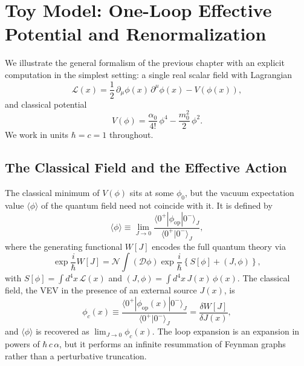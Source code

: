 \chapter{Toy Model: One-Loop Effective Potential and Renormalization}
\label{ch:toy-model}

We illustrate the general formalism of the previous chapter with an
explicit computation in the simplest setting: a single real scalar field
with Lagrangian
\begin{equation}
	\mathcal{L}(x) = \frac{1}{2}\,\partial_\mu\phi(x)\,\partial^\mu\phi(x)
	- V(\phi(x)),
	\label{eq:real_scalar_field}
\end{equation}
and classical potential
\begin{equation}
	V(\phi) = \frac{\alpha_0}{4!}\,\phi^4 - \frac{m_0^2}{2}\,\phi^2.
\end{equation}
We work in units $\hbar = c = 1$ throughout.

\section{The Classical Field and the Effective Action}

The classical minimum of $V(\phi)$ sits at some $\phi_0$, but the vacuum
expectation value $\langle\phi\rangle$ of the quantum field need not
coincide with it. It is defined by
\begin{equation}
	\langle\phi\rangle \equiv \lim_{J\to 0}
	\frac{\langle 0^+|\phi_{\text{op}}|0^-\rangle_J}
	{\langle 0^+|0^-\rangle_J},
\end{equation}
where the generating functional $W[J]$ encodes the full quantum theory via
\begin{equation}
	\exp\frac{i}{\hbar}W[J]
	= \mathcal{N}\int(\mathcal{D}\phi)
	\exp\frac{i}{\hbar}\left\{S[\phi] + (J,\phi)\right\},
\end{equation}
with $S[\phi] = \int d^4x\,\mathcal{L}(x)$ and
$(J,\phi) = \int d^4x\,J(x)\,\phi(x)$.
The classical field, the VEV in the presence of an external source $J(x)$,
is
\begin{equation}
	\phi_c(x) \equiv
	\frac{\langle 0^+|\phi_{\text{op}}(x)|0^-\rangle_J}
	{\langle 0^+|0^-\rangle_J}
	= \frac{\delta W[J]}{\delta J(x)},
	\label{eq:phi_c}
\end{equation}
and $\langle\phi\rangle$ is recovered as $\lim_{J\to 0}\phi_c(x)$. The
loop expansion is an expansion in powers of $\hbar\,c\,\alpha$, but it
performs an infinite resummation of Feynman graphs rather than a
perturbative truncation.

